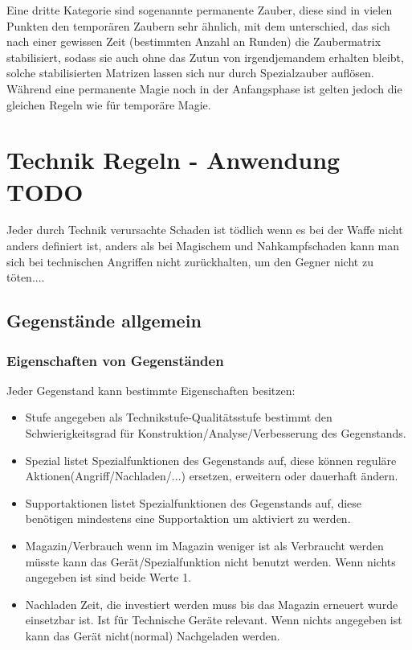 Eine dritte Kategorie sind sogenannte permanente Zauber, diese sind in vielen Punkten den temporären Zaubern sehr ähnlich, mit dem unterschied, das sich nach einer gewissen Zeit (bestimmten Anzahl an Runden) die Zaubermatrix stabilisiert, sodass sie auch ohne das Zutun von irgendjemandem erhalten bleibt, solche stabilisierten Matrizen lassen sich nur durch Spezialzauber auflösen.
Während eine permanente Magie noch in der Anfangsphase ist gelten jedoch die gleichen Regeln wie für temporäre Magie.

\chapter{Technik Regeln - Anwendung TODO}

Jeder durch Technik verursachte Schaden ist tödlich wenn es bei der Waffe nicht anders definiert ist, anders als bei Magischem und Nahkampfschaden kann man sich bei technischen Angriffen nicht zurückhalten, um den Gegner nicht zu töten....

\section{Gegenstände allgemein}
\subsection{Eigenschaften von Gegenständen}
Jeder Gegenstand kann bestimmte Eigenschaften besitzen:

\begin{itemize}
\item Stufe angegeben als Technikstufe-Qualitätsstufe bestimmt den Schwierigkeitsgrad für Konstruktion/Analyse/Verbesserung des Gegenstands.
\item Spezial listet Spezialfunktionen des Gegenstands auf, diese können reguläre Aktionen(Angriff/Nachladen/...) ersetzen, erweitern oder dauerhaft ändern.
\item Supportaktionen listet Spezialfunktionen des Gegenstands auf, diese benötigen mindestens eine Supportaktion um aktiviert zu werden.
\item Magazin/Verbrauch wenn im Magazin weniger ist als Verbraucht werden müsste kann das Gerät/Spezialfunktion nicht benutzt werden. Wenn nichts angegeben ist sind beide Werte 1.
\item Nachladen Zeit, die investiert werden muss bis das Magazin erneuert wurde einsetzbar ist. Ist für Technische Geräte relevant. Wenn nichts angegeben ist kann das Gerät nicht(normal) Nachgeladen werden.
\end{itemize}


